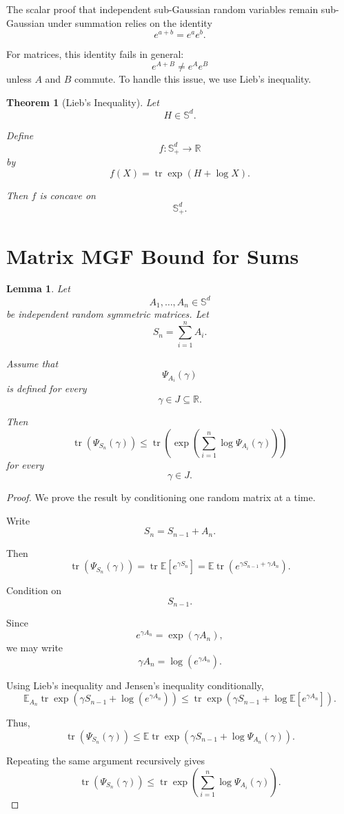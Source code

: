 \documentclass[12pt,oneside]{book}
\numberwithin{equation}{section}
\theoremstyle{definition}
\theoremstyle{plain}
\newtheorem{theorem}{Theorem}[section]
\newtheorem{lemma}{Lemma}[section]
\theoremstyle{remark}
\newcommand{\R}{\mathbb{R}}
\newcommand{\E}{\mathbb{E}}
\newcommand{\tr}{\operatorname{tr}}
\begin{document}
The scalar proof that independent sub-Gaussian random variables remain sub-Gaussian under summation relies on the identity
\[
e^{a+b}=e^ae^b.
\]

For matrices, this identity fails in general:
\[
e^{A+B}\neq e^Ae^B
\]
unless $A$ and $B$ commute. To handle this issue, we use Lieb's inequality.

\begin{theorem}[Lieb's Inequality]
Let
\[
H\in\mathbb{S}^d.
\]

Define
\[
f:\mathbb{S}_+^d\to\R
\]
by
\[
f(X)
=
\tr\exp(H+\log X).
\]

Then $f$ is concave on
\[
\mathbb{S}_+^d.
\]
\end{theorem}

\section{Matrix MGF Bound for Sums}

\begin{lemma}
Let
\[
A_1,\dots,A_n\in\mathbb{S}^d
\]
be independent random symmetric matrices. Let
\[
S_n=\sum_{i=1}^n A_i.
\]

Assume that
\[
\Psi_{A_i}(\gamma)
\]
is defined for every
\[
\gamma\in J\subseteq\R.
\]

Then
\[
\tr(\Psi_{S_n}(\gamma))
\leq
\tr\left(
\exp\left(
\sum_{i=1}^n \log \Psi_{A_i}(\gamma)
\right)
\right)
\]
for every
\[
\gamma\in J.
\]
\end{lemma}

\begin{proof}
We prove the result by conditioning one random matrix at a time.

Write
\[
S_n=S_{n-1}+A_n.
\]

Then
\[
\tr(\Psi_{S_n}(\gamma))
=
\tr\E[e^{\gamma S_n}]
=
\E\tr(e^{\gamma S_{n-1}+\gamma A_n}).
\]

Condition on
\[
S_{n-1}.
\]

Since
\[
e^{\gamma A_n}
=
\exp(\gamma A_n),
\]
we may write
\[
\gamma A_n
=
\log(e^{\gamma A_n}).
\]

Using Lieb's inequality and Jensen's inequality conditionally,
\[
\E_{A_n}
\tr\exp(\gamma S_{n-1}+\log(e^{\gamma A_n}))
\leq
\tr\exp(\gamma S_{n-1}+\log \E[e^{\gamma A_n}]).
\]

Thus,
\[
\tr(\Psi_{S_n}(\gamma))
\leq
\E\tr\exp(\gamma S_{n-1}+\log\Psi_{A_n}(\gamma)).
\]

Repeating the same argument recursively gives
\[
\tr(\Psi_{S_n}(\gamma))
\leq
\tr\exp\left(
\sum_{i=1}^n \log\Psi_{A_i}(\gamma)
\right).
\]
\end{proof}
\end{document}
